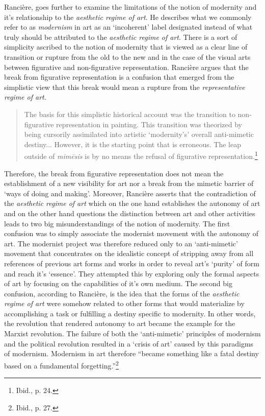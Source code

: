 Ranci\`{e}re, goes further to examine the limitations of the notion of modernity and it's relationship to the \emph{aesthetic regime of art}. He describes what we commonly refer to as \emph{modernism} in art as an `incoherent' label designated instead of what truly should be attributed to the \emph{aesthetic regime of art}. There is a sort of simplicity ascribed to the notion of modernity that is viewed as a clear line of transition or rupture from the old to the new and in the case of the visual arts between figurative and non-figurative representation. Ranci\`{e}re argues that the break from figurative representation is a confusion that emerged from the simplistic view that this break would mean a rupture from the \emph{representative regime of art}.

\begin{quote}
The basis for this simplistic historical account was the transition to non-figurative representation in painting. This transition was theorized by being cursorily assimilated into artistic `modernity's' overall anti-mimetic destiny... However, it is the starting point that is erroneous. The leap outside of \emph{mim\={e}sis} is by no means the refusal of figurative representation.\footnote{Ibid., p. 24.}
\end{quote}

Therefore, the break from figurative representation does not mean the establishment of a new visibility for art nor a break from the mimetic barrier of `ways of doing and making'. Moreover, Ranci\`{e}re asserts that the contradiction of the \emph{aesthetic regime of art} which on the one hand establishes the autonomy of art and on the other hand questions the distinction between art and other activities leads to two big misunderstandings of the notion of modernity. The first confusion was to simply associate the modernist movement with the autonomy of art. The modernist project was therefore reduced only to an `anti-mimetic' movement that concentrates on the idealistic concept of stripping away from all references of previous art forms and works in order to reveal art's `purity' of form and reach it's `essence'. They attempted this by exploring only the formal aspects of art by focusing on the capabilities of it's own medium. The second big confusion, according to Ranci\`{e}re, is the idea that the forms of the \emph{aesthetic regime of art} were somehow related to other forms that would materialize by accomplishing a task or fulfilling a destiny specific to modernity. In other words, the revolution that rendered autonomy to art became the example for the Marxist revolution. The failure of both the `anti-mimetic' principles of modernism and the political revolution resulted in a `crisis of art' caused by this paradigms of modernism. Modernism in art therefore ``became something like a fatal destiny based on a fundamental forgetting.''\footnote{Ibid., p. 27.} 


